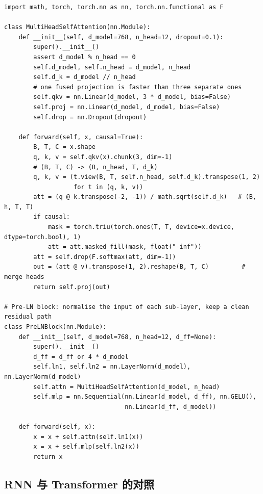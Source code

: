 \begin{lstlisting}[style=growth, language=PyTorch, caption={多头自注意力的核心实现（含因果掩码）}]
import math, torch, torch.nn as nn, torch.nn.functional as F

class MultiHeadSelfAttention(nn.Module):
    def __init__(self, d_model=768, n_head=12, dropout=0.1):
        super().__init__()
        assert d_model % n_head == 0
        self.d_model, self.n_head = d_model, n_head
        self.d_k = d_model // n_head
        # one fused projection is faster than three separate ones
        self.qkv = nn.Linear(d_model, 3 * d_model, bias=False)
        self.proj = nn.Linear(d_model, d_model, bias=False)
        self.drop = nn.Dropout(dropout)

    def forward(self, x, causal=True):
        B, T, C = x.shape
        q, k, v = self.qkv(x).chunk(3, dim=-1)
        # (B, T, C) -> (B, n_head, T, d_k)
        q, k, v = (t.view(B, T, self.n_head, self.d_k).transpose(1, 2)
                   for t in (q, k, v))
        att = (q @ k.transpose(-2, -1)) / math.sqrt(self.d_k)   # (B, h, T, T)
        if causal:
            mask = torch.triu(torch.ones(T, T, device=x.device, dtype=torch.bool), 1)
            att = att.masked_fill(mask, float("-inf"))
        att = self.drop(F.softmax(att, dim=-1))
        out = (att @ v).transpose(1, 2).reshape(B, T, C)         # merge heads
        return self.proj(out)

# Pre-LN block: normalise the input of each sub-layer, keep a clean residual path
class PreLNBlock(nn.Module):
    def __init__(self, d_model=768, n_head=12, d_ff=None):
        super().__init__()
        d_ff = d_ff or 4 * d_model
        self.ln1, self.ln2 = nn.LayerNorm(d_model), nn.LayerNorm(d_model)
        self.attn = MultiHeadSelfAttention(d_model, n_head)
        self.mlp = nn.Sequential(nn.Linear(d_model, d_ff), nn.GELU(),
                                 nn.Linear(d_ff, d_model))

    def forward(self, x):
        x = x + self.attn(self.ln1(x))
        x = x + self.mlp(self.ln2(x))
        return x
\end{lstlisting}

\subsection{RNN 与 Transformer 的对照}

